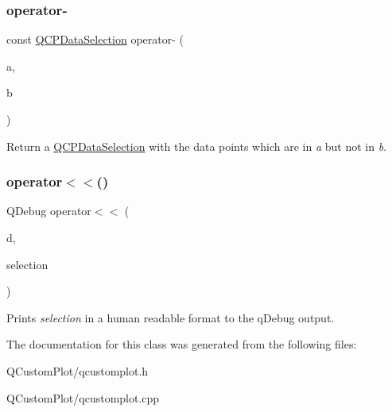\subsubsection{\texorpdfstring{operator-\/}{operator-}\hspace{0.1cm}{\footnotesize\ttfamily [4/4]}}
{\footnotesize\ttfamily const \mbox{\hyperlink{class_q_c_p_data_selection}{Q\+C\+P\+Data\+Selection}} operator-\/ (\begin{DoxyParamCaption}\item[{const \mbox{\hyperlink{class_q_c_p_data_range}{Q\+C\+P\+Data\+Range}} \&}]{a,  }\item[{const \mbox{\hyperlink{class_q_c_p_data_range}{Q\+C\+P\+Data\+Range}} \&}]{b }\end{DoxyParamCaption})\hspace{0.3cm}{\ttfamily [friend]}}

Return a \mbox{\hyperlink{class_q_c_p_data_selection}{Q\+C\+P\+Data\+Selection}} with the data points which are in {\itshape a} but not in {\itshape b}. \mbox{\label{class_q_c_p_data_selection_aed65b8988afe6b03adeadf5edf663670}} 
\subsubsection{\texorpdfstring{operator$<$$<$()}{operator<<()}}
{\footnotesize\ttfamily Q\+Debug operator$<$$<$ (\begin{DoxyParamCaption}\item[{Q\+Debug}]{d,  }\item[{const \mbox{\hyperlink{class_q_c_p_data_selection}{Q\+C\+P\+Data\+Selection}} \&}]{selection }\end{DoxyParamCaption})\hspace{0.3cm}{\ttfamily [related]}}

Prints {\itshape selection} in a human readable format to the q\+Debug output. 

The documentation for this class was generated from the following files\+:\begin{DoxyCompactItemize}
\item 
Q\+Custom\+Plot/qcustomplot.\+h\item 
Q\+Custom\+Plot/qcustomplot.\+cpp\end{DoxyCompactItemize}
